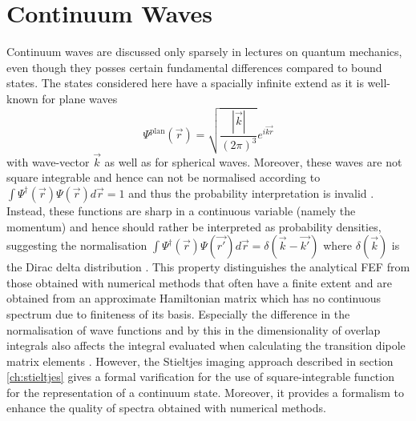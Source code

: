 \section{Continuum Waves}
\label{ch:contwa}
Continuum waves are discussed only sparsely in lectures on quantum mechanics, even though they posses certain fundamental differences compared to bound states.
The states considered here have a spacially infinite extend as it is well-known for plane waves 
\begin{equation}\label{eq:PlWave}
\Psi^\text{plan}(\vec{r})=\sqrt{\frac{|\vec{k}|}{(2\pi)^3}}e^{i\vec{kr}}
\end{equation}
with wave-vector $\vec{k}$ as well as for spherical waves. %
Moreover, these waves are not square integrable and hence can not be normalised according to $\int \Psi^\dagger(\vec{r})\Psi(\vec{r}) d\vec{r}=1$ and thus the probability interpretation is invalid \cite{quirky}.
Instead, these functions are sharp in a continuous variable (namely the momentum) and hence should rather be interpreted as probability densities, suggesting the normalisation 
$\int \Psi^\dagger(\vec{r})\Psi(\vec{r'}) d\vec{r}=\delta(\vec{k}-\vec{k'})$ where $\delta(\vec{k})$ is the Dirac delta distribution \cite{quirky}.
This property distinguishes the analytical FEF from those obtained with numerical methods that often have a finite extent and are obtained from an approximate Hamiltonian matrix which has no continuous spectrum due to finiteness of its basis.
Especially the difference in the normalisation of wave functions and by this in the dimensionality of overlap integrals also affects the integral evaluated when calculating the transition dipole matrix elements \cite{stieltjesCeder}.
However, the Stieltjes imaging approach described in section \ref{ch:stieltjes} gives a formal varification for the use of square-integrable function for the representation of a continuum state. %
Moreover, it provides a formalism to enhance the quality of spectra obtained with numerical methods.

